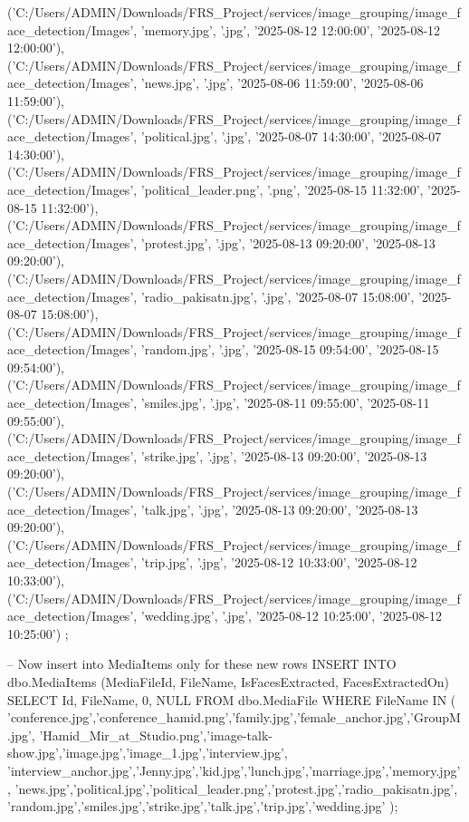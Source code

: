 ('C:/Users/ADMIN/Downloads/FRS_Project/services/image_grouping/image_face_detection/Images', 'memory.jpg', '.jpg', '2025-08-12 12:00:00', '2025-08-12 12:00:00'),
('C:/Users/ADMIN/Downloads/FRS_Project/services/image_grouping/image_face_detection/Images', 'news.jpg', '.jpg', '2025-08-06 11:59:00', '2025-08-06 11:59:00'),
('C:/Users/ADMIN/Downloads/FRS_Project/services/image_grouping/image_face_detection/Images', 'political.jpg', '.jpg', '2025-08-07 14:30:00', '2025-08-07 14:30:00'),
('C:/Users/ADMIN/Downloads/FRS_Project/services/image_grouping/image_face_detection/Images', 'political_leader.png', '.png', '2025-08-15 11:32:00', '2025-08-15 11:32:00'),
('C:/Users/ADMIN/Downloads/FRS_Project/services/image_grouping/image_face_detection/Images', 'protest.jpg', '.jpg', '2025-08-13 09:20:00', '2025-08-13 09:20:00'),
('C:/Users/ADMIN/Downloads/FRS_Project/services/image_grouping/image_face_detection/Images', 'radio_pakisatn.jpg', '.jpg', '2025-08-07 15:08:00', '2025-08-07 15:08:00'),
('C:/Users/ADMIN/Downloads/FRS_Project/services/image_grouping/image_face_detection/Images', 'random.jpg', '.jpg', '2025-08-15 09:54:00', '2025-08-15 09:54:00'),
('C:/Users/ADMIN/Downloads/FRS_Project/services/image_grouping/image_face_detection/Images', 'smiles.jpg', '.jpg', '2025-08-11 09:55:00', '2025-08-11 09:55:00'),
('C:/Users/ADMIN/Downloads/FRS_Project/services/image_grouping/image_face_detection/Images', 'strike.jpg', '.jpg', '2025-08-13 09:20:00', '2025-08-13 09:20:00'),
('C:/Users/ADMIN/Downloads/FRS_Project/services/image_grouping/image_face_detection/Images', 'talk.jpg', '.jpg', '2025-08-13 09:20:00', '2025-08-13 09:20:00'),
('C:/Users/ADMIN/Downloads/FRS_Project/services/image_grouping/image_face_detection/Images', 'trip.jpg', '.jpg', '2025-08-12 10:33:00', '2025-08-12 10:33:00'),
('C:/Users/ADMIN/Downloads/FRS_Project/services/image_grouping/image_face_detection/Images', 'wedding.jpg', '.jpg', '2025-08-12 10:25:00', '2025-08-12 10:25:00')
;

-- Now insert into MediaItems only for these new rows
INSERT INTO dbo.MediaItems (MediaFileId, FileName, IsFacesExtracted, FacesExtractedOn)
SELECT Id, FileName, 0, NULL
FROM dbo.MediaFile
WHERE FileName IN (
    'conference.jpg','conference_hamid.png','family.jpg','female_anchor.jpg','GroupM.jpg',
    'Hamid_Mir_at_Studio.png','image-talk-show.jpg','image.jpg','image_1.jpg','interview.jpg',
    'interview_anchor.jpg','Jenny.jpg','kid.jpg','lunch.jpg','marriage.jpg','memory.jpg',
    'news.jpg','political.jpg','political_leader.png','protest.jpg','radio_pakisatn.jpg',
    'random.jpg','smiles.jpg','strike.jpg','talk.jpg','trip.jpg','wedding.jpg'
);


